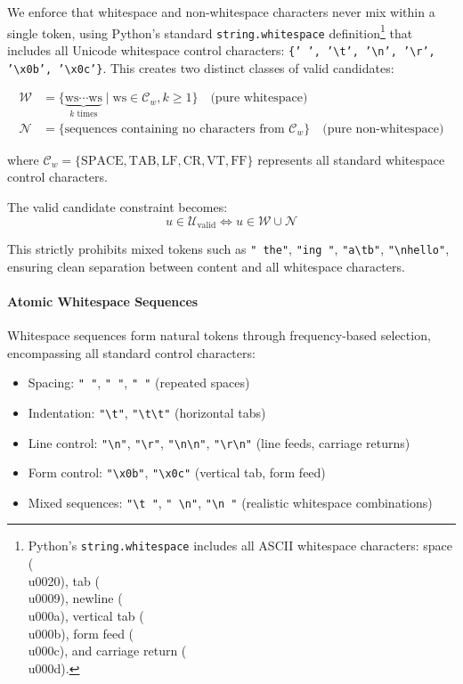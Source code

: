 We enforce that whitespace and non-whitespace characters never mix within a single token, using Python's standard \texttt{string.whitespace} definition\footnote{Python's \texttt{string.whitespace} includes all ASCII whitespace characters: space (\\u0020), tab (\\u0009), newline (\\u000a), vertical tab (\\u000b), form feed (\\u000c), and carriage return (\\u000d).} that includes all Unicode whitespace control characters: \texttt{\{' ', '\textbackslash t', '\textbackslash n', '\textbackslash r', '\textbackslash x0b', '\textbackslash x0c'\}}. This creates two distinct classes of valid candidates:

\begin{align}
\mathcal{W} &= \{\underbrace{\text{ws} \cdots \text{ws}}_{k \text{ times}} \mid \text{ws} \in \mathcal{C}_w, k \geq 1\} \quad\text{(pure whitespace)} \\
\mathcal{N} &= \{\text{sequences containing no characters from } \mathcal{C}_w\} \quad\text{(pure non-whitespace)}
\end{align}

where $\mathcal{C}_w = \{\text{SPACE}, \text{TAB}, \text{LF}, \text{CR}, \text{VT}, \text{FF}\}$ represents all standard whitespace control characters.

The valid candidate constraint becomes:
\[
u \in \mathcal{U}_{\text{valid}} \iff u \in \mathcal{W} \cup \mathcal{N}
\]

This strictly prohibits mixed tokens such as \texttt{" the"}, \texttt{"ing "}, \texttt{"a\textbackslash tb"}, \texttt{"\textbackslash nhello"}, ensuring clean separation between content and all whitespace characters.

\paragraph{Atomic Whitespace Sequences}

Whitespace sequences form natural tokens through frequency-based selection, encompassing all standard control characters:

\begin{itemize}
    \item Spacing: \texttt{" "}, \texttt{"  "}, \texttt{"    "} (repeated spaces)
    \item Indentation: \texttt{"\textbackslash t"}, \texttt{"\textbackslash t\textbackslash t"} (horizontal tabs)
    \item Line control: \texttt{"\textbackslash n"}, \texttt{"\textbackslash r"}, \texttt{"\textbackslash n\textbackslash n"}, \texttt{"\textbackslash r\textbackslash n"} (line feeds, carriage returns)
    \item Form control: \texttt{"\textbackslash x0b"}, \texttt{"\textbackslash x0c"} (vertical tab, form feed)
    \item Mixed sequences: \texttt{"\textbackslash t "}, \texttt{" \textbackslash n"}, \texttt{"\textbackslash n  "} (realistic whitespace combinations)
\end{itemize}

